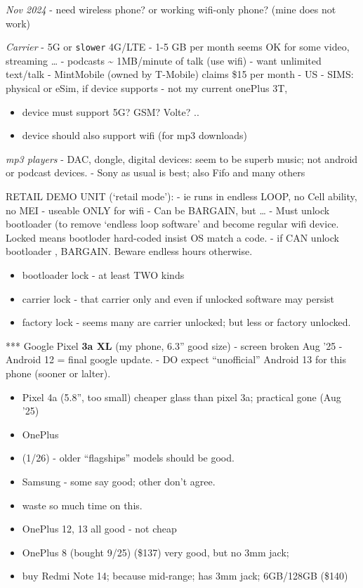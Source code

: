 \documentclass[
  letterpaper,
  DIV=11,
  numbers=noendperiod]{scrartcl}
\providecommand{\tightlist}{%
  \setlength{\itemsep}{0pt}\setlength{\parskip}{0pt}}\usepackage{longtable,booktabs,array}
\begin{document}
\emph{Nov 2024} - need wireless phone? or working wifi-only phone? (mine
does not work)

\emph{Carrier} - 5G or \texttt{slower} 4G/LTE - 1-5 GB per month seems
OK for some video, streaming \ldots{} - podcasts \textasciitilde{}
1MB/minute of talk (use wifi) - want unlimited text/talk - MintMobile
(owned by T-Mobile) claims \$15 per month - US - SIMS: physical or eSim,
if device supports - not my current onePlus 3T,

\begin{itemize}
\tightlist
\item
  device must support 5G? GSM? Volte? ..
\item
  device should also support wifi (for mp3 downloads)
\end{itemize}

\emph{mp3 players} - DAC, dongle, digital devices: seem to be superb
music; not android or podcast devices. - Sony as usual is best; also
Fifo and many others

RETAIL DEMO UNIT (`retail mode'): - ie runs in endless LOOP, no Cell
ability, no MEI - useable ONLY for wifi - Can be BARGAIN, but \ldots{} -
Must unlock bootloader (to remove `endless loop software' and become
regular wifi device. Locked means bootloder hard-coded insist OS match a
code. - if CAN unlock bootloader , BARGAIN. Beware endless hours
otherwise.

\begin{itemize}
\tightlist
\item
  bootloader lock - at least TWO kinds
\item
  carrier lock - that carrier only and even if unlocked software may
  persist
\item
  factory lock - seems many are carrier unlocked; but less or factory
  unlocked.
\end{itemize}

*** Google Pixel \textbf{3a XL} (my phone, 6.3'' good size) - screen
broken Aug '25 - Android 12 = final google update. - DO expect
``unofficial'' Android 13 for this phone (sooner or lalter).

\begin{itemize}
\item
  Pixel 4a (5.8'', too small) cheaper glass than pixel 3a; practical
  gone (Aug '25)
\item
  OnePlus
\item
  (1/26) - older ``flagships'' models should be good.
\item
  Samsung - some say good; other don't agree.
\item
  waste so much time on this.
\item
  OnePlus 12, 13 all good - not cheap
\item
  OnePlus 8 (bought 9/25) (\$137) very good, but no 3mm jack;
\item
  buy Redmi Note 14; because mid-range; has 3mm jack; 6GB/128GB (\$140)
\end{itemize}
\end{document}
